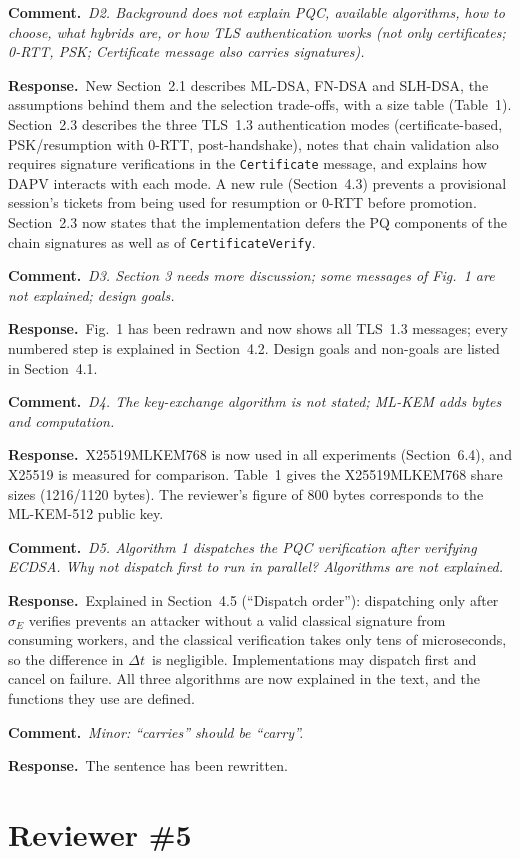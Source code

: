 \documentclass[11pt]{article}
\newcommand{\RC}[1]{\par\medskip\noindent\textcolor{rc}{\textbf{Comment.}}~\textit{#1}\par}
\newcommand{\AR}{\par\noindent\textbf{Response.}~}
\newcommand{\Dt}{\ensuremath{\Delta t}}
\begin{document}
\RC{D2. Background does not explain PQC, available algorithms, how to
choose, what hybrids are, or how TLS authentication works (not only
certificates; 0-RTT, PSK; Certificate message also carries signatures).}
\AR New Section~2.1 describes ML-DSA, FN-DSA and SLH-DSA, the assumptions
behind them and the selection trade-offs, with a size table (Table~1).
Section~2.3 describes the three TLS~1.3 authentication modes
(certificate-based, PSK/resumption with 0-RTT, post-handshake), notes
that chain validation also requires signature verifications in the
\texttt{Certificate} message, and explains how DAPV interacts with each
mode.  A new rule (Section~4.3) prevents a provisional session's
tickets from being used for resumption or 0-RTT before promotion.
Section~2.3 now states that the implementation defers the PQ components of
the chain signatures as well as of \texttt{CertificateVerify}.

\RC{D3. Section 3 needs more discussion; some messages of Fig.~1 are not
explained; design goals.}
\AR Fig.~1 has been redrawn and now shows all TLS~1.3 messages; every
numbered step is explained in Section~4.2.  Design goals and non-goals are
listed in Section~4.1.

\RC{D4. The key-exchange algorithm is not stated; ML-KEM adds bytes and
computation.}
\AR X25519MLKEM768 is now used in all experiments (Section~6.4), and
X25519 is measured for comparison.  Table~1 gives the X25519MLKEM768 share
sizes (1216/1120 bytes).  The reviewer's figure of 800 bytes corresponds to
the ML-KEM-512 public key.

\RC{D5. Algorithm 1 dispatches the PQC verification after verifying ECDSA.
Why not dispatch first to run in parallel?  Algorithms are not explained.}
\AR Explained in Section~4.5 (``Dispatch order''): dispatching only after
$\sigma_E$ verifies prevents an attacker without a valid classical
signature from consuming workers, and the classical verification takes
only tens of microseconds, so the difference in \Dt\ is negligible.
Implementations may dispatch first and cancel on failure.  All three
algorithms are now explained in the text, and the functions they use are
defined.

\RC{Minor: ``carries'' should be ``carry''.}
\AR The sentence has been rewritten.

\section*{Reviewer \#5}
\end{document}

